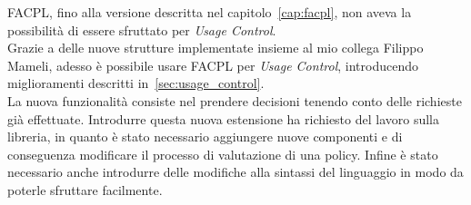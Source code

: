 
FACPL, fino alla versione descritta nel capitolo~\ref{cap:facpl}, non aveva la possibilità
di essere sfruttato per \textit{Usage Control}.\\
Grazie a delle nuove strutture implementate insieme al mio collega Filippo Mameli, adesso è possibile
usare FACPL per \textit{Usage Control}, introducendo miglioramenti descritti in~\ref{sec:usage_control}.\\
La nuova funzionalità consiste nel prendere decisioni tenendo conto delle richieste già effettuate.
Introdurre questa nuova estensione ha richiesto del lavoro sulla libreria, in quanto è stato necessario aggiungere
nuove componenti e di conseguenza modificare il processo di valutazione di una policy.
Infine è stato necessario anche introdurre delle modifiche alla sintassi del linguaggio in modo da poterle sfruttare 
facilmente.

